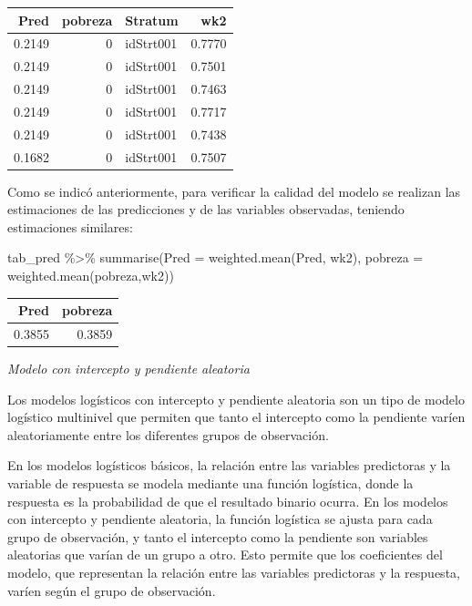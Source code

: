\documentclass[
  12pt,
]{book}
\newenvironment{Shaded}{\begin{snugshade}}{\end{snugshade}}
\newcommand{\AttributeTok}[1]{\textcolor[rgb]{0.77,0.63,0.00}{#1}}
\newcommand{\FunctionTok}[1]{\textcolor[rgb]{0.00,0.00,0.00}{#1}}
\newcommand{\NormalTok}[1]{#1}
\newcommand{\SpecialCharTok}[1]{\textcolor[rgb]{0.00,0.00,0.00}{#1}}
\begin{document}
\begin{tabular}{r|r|l|r}
\hline
Pred & pobreza & Stratum & wk2\\
\hline
0.2149 & 0 & idStrt001 & 0.7770\\
\hline
0.2149 & 0 & idStrt001 & 0.7501\\
\hline
0.2149 & 0 & idStrt001 & 0.7463\\
\hline
0.2149 & 0 & idStrt001 & 0.7717\\
\hline
0.2149 & 0 & idStrt001 & 0.7438\\
\hline
0.1682 & 0 & idStrt001 & 0.7507\\
\hline
\end{tabular}

Como se indicó anteriormente, para verificar la calidad del modelo se realizan las estimaciones de las predicciones y de las variables observadas, teniendo estimaciones similares:

\begin{Shaded}
\begin{Highlighting}[]
\NormalTok{tab\_pred }\SpecialCharTok{\%\textgreater{}\%} 
  \FunctionTok{summarise}\NormalTok{(}\AttributeTok{Pred =} \FunctionTok{weighted.mean}\NormalTok{(Pred, wk2), }
            \AttributeTok{pobreza =} \FunctionTok{weighted.mean}\NormalTok{(pobreza,wk2))}
\end{Highlighting}
\end{Shaded}

\begin{tabular}{r|r}
\hline
Pred & pobreza\\
\hline
0.3855 & 0.3859\\
\hline
\end{tabular}

\emph{Modelo con intercepto y pendiente aleatoria}

Los modelos logísticos con intercepto y pendiente aleatoria son un tipo de modelo logístico multinivel que permiten que tanto el intercepto como la pendiente varíen aleatoriamente entre los diferentes grupos de observación.

En los modelos logísticos básicos, la relación entre las variables predictoras y la variable de respuesta se modela mediante una función logística, donde la respuesta es la probabilidad de que el resultado binario ocurra. En los modelos con intercepto y pendiente aleatoria, la función logística se ajusta para cada grupo de observación, y tanto el intercepto como la pendiente son variables aleatorias que varían de un grupo a otro. Esto permite que los coeficientes del modelo, que representan la relación entre las variables predictoras y la respuesta, varíen según el grupo de observación.
\end{document}
